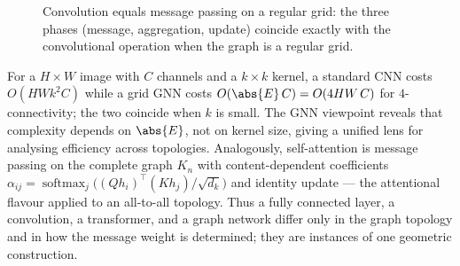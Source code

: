 \begin{figure}[h]
\centering
{}
\caption[Convolution as message passing]{Convolution equals message passing on a
regular grid: the three phases (message, aggregation, update) coincide exactly
with the convolutional operation when the graph is a regular grid.}
\label{fig:graphs:conv-mp}
\end{figure}

For a $H \times W$ image with $C$ channels and a $k \times k$ kernel, a standard
CNN costs $O(HW k^2 C)$ while a grid GNN costs $O(\abs{E}\, C) = O(4HW\, C)$ for
$4$-connectivity; the two coincide when $k$ is small. The GNN viewpoint reveals
that complexity depends on $\abs{E}$, not on kernel size, giving a unified lens
for analysing efficiency across topologies. Analogously, self-attention is
message passing on the complete graph $K_n$ with content-dependent coefficients
$\alpha_{ij} = \operatorname{softmax}_j\big((Q h_i)^\top (K h_j)/\sqrt{d_k}\big)$
and identity update --- the attentional flavour applied to an all-to-all
topology. Thus a fully connected layer, a convolution, a transformer, and a graph
network differ only in the graph topology and in how the message weight is
determined; they are instances of one geometric construction.

